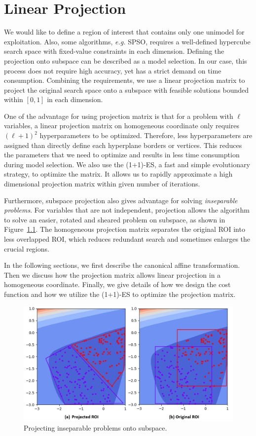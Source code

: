 \chapter{Linear Projection}
\label{chapter:projection} 

We would like to define a region of interest that contains only one unimodel for exploitation.
Also, some algorithms, \textit{e.g.} SPSO, requires a well-defined hypercube search space with fixed-value constraints in each dimension.
Defining the projection onto subspace can be described as a model selection.
In our case, this process does not require high accuracy, yet has a strict demand on time consumption.
Combining the requirements, we use a linear projection matrix to project the original search space 
onto a subspace with feasible solutions bounded within $[0,1]$ in each dimension.

One of the advantage for using projection matrix is that for a problem with $\ell$ variables, 
a linear projection matrix on homogeneous coordinate only requires $(\ell+1)^2$ hyperparameters to be optimized.
Therefore, less hyperparameters are assigned than directly define each hyperplane borders or vertices.  
This reduces the parameters that we need to optimize and results in less time consumption during model selection.
We also use the (1+1)-ES, a fast and simple evolutionary strategy, to optimize the matrix.
It allows us to rapidly approximate a high dimensional projection matrix within given number of iterations.

Furthermore, subspace projection also gives advantage for solving \textit{inseparable problems}.
For variables that are not independent, projection allows the algorithm
to solve an easier, rotated and sheared problem on subspace, as shown in Figure~\ref{fig:Projected_ROI}.
The homogeneous projection matrix separates the original ROI into less overlapped ROI, 
which reduces redundant search and sometimes enlarges the crucial regions.

In the following sections, we first describe the canonical affine transformation.
Then we discuss how the projection matrix allows linear projection in a homogeneous coordinate.
Finally, we give details of how we design the cost function and how we utilize the (1+1)-ES to optimize the projection matrix.

\begin{figure}
\centering
\includegraphics[width=\textwidth]{Projected_ROI}
\caption{Projecting inseparable problems onto subspace.}\label{fig:Projected_ROI}
\end{figure}

